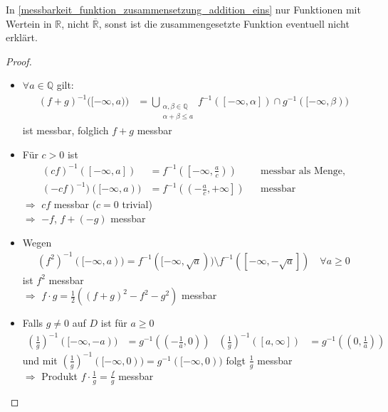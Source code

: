 \begin{underlinedenvironment}[Hinweis]
	In \ref{messbarkeit_funktion_zusammensetzung_addition_eins} nur Funktionen mit Wertein in $\mathbb{R}$, nicht $\overline{\mathbb{R}}$, sonst ist die zusammengesetzte Funktion eventuell nicht erklärt.
\end{underlinedenvironment}

\begin{proof}\hspace*{0pt}
	\NoEndMark
	\begin{itemize}
	\item $\forall a\in\mathbb{Q}$ gilt: \begin{align*}
		\left( f + g\right)^{-1}\big( [-\infty, a) \big) &= \bigcup\limits_{\substack{\alpha,\beta\in\mathbb{Q}\\ \alpha + \beta \le a}} f^ {-1} ([-\infty,\alpha])\cap g^{-1}([-\infty,\beta))
	\end{align*}
	ist messbar, folglich $f+g$ messbar
	
	\item Für $c > 0$ ist \begin{align*}
		(cf)^{-1}([-\infty, a]) &= f^{-1} \left(\left[ -\infty,\frac{a}{c}\right)\right)&&\text{messbar als Menge,} \\
		(-cf)^{-1}) ([-\infty,a)) &= f^{-1}\left( \left(-\frac{a}{c},+\infty \right]\right)&&\text{messbar}
	\end{align*}
	$\Rightarrow$ $cf$ messbar ($c=0$ trivial) \\
	$\Rightarrow$ $-f$, $f+(-g)$ messbar
	
	\item Wegen \begin{align*}\left(f^2\right)^{-1}([-\infty,a)) = f^{-1}([-\infty,\sqrt{a}))\setminus f^{-1}([-\infty,-\sqrt{a}])\quad \forall a\ge 0\end{align*} ist $f^2$ messbar \\
	$\Rightarrow$ $f\cdot g = \frac{1}{2}\left( (f+g)^2 - f^2 - g^2\right)$ messbar
	
	\item Falls $g\neq 0$ auf $D$ ist für $a\ge 0$ \begin{align*}
		\left( \frac{1}{g}\right)^{-1} ([-\infty, -a)) &= g^{-1}\left( \left( -\frac{1}{a}, 0\right)\right) & \left( \frac{1}{g}\right)^{-1} ([a,\infty]) &= g^{-1} \left( \left( 0,\frac{1}{a}\right) \right)
	\end{align*}
	und mit $\left( \frac{1}{g}\right)^{-1}([-\infty,0)) = g^{-1}([-\infty, 0))$ folgt $\frac{1}{g}$ messbar \\
	$\Rightarrow$ Produkt $f\cdot \frac{1}{g} = \frac{f}{g}$ messbar
	

\end{itemize}
\end{proof}
